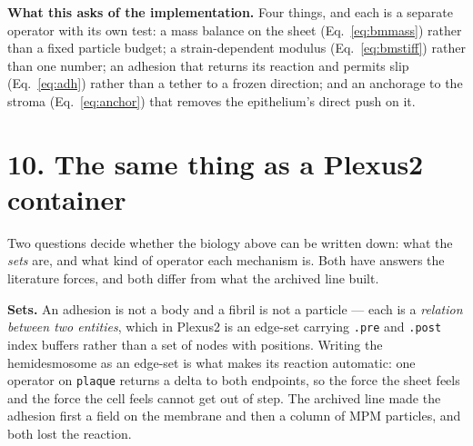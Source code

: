 \documentclass[10pt,a4paper]{article}
\newcommand{\code}[1]{\texttt{#1}}
\begin{document}
\textbf{What this asks of the implementation.} Four things, and each is a separate operator with its
own test: a mass balance on the sheet (Eq.~\ref{eq:bmmass}) rather than a fixed particle budget; a
strain-dependent modulus (Eq.~\ref{eq:bmstiff}) rather than one number; an adhesion that returns its
reaction and permits slip (Eq.~\ref{eq:adh}) rather than a tether to a frozen direction; and an
anchorage to the stroma (Eq.~\ref{eq:anchor}) that removes the epithelium's direct push on it.

\section*{10.\; The same thing as a Plexus2 container}

Two questions decide whether the biology above can be written down: what the \emph{sets} are, and what
kind of operator each mechanism is. Both have answers the literature forces, and both differ from what
the archived line built.

\textbf{Sets.} An adhesion is not a body and a fibril is not a particle --- each is a \emph{relation
between two entities}, which in Plexus2 is an edge-set carrying \code{.pre} and \code{.post} index
buffers rather than a set of nodes with positions. Writing the hemidesmosome as an edge-set is what
makes its reaction automatic: one operator on \code{plaque} returns a delta to both endpoints, so the
force the sheet feels and the force the cell feels cannot get out of step. The archived line made the
adhesion first a field on the membrane and then a column of MPM particles, and both lost the reaction.
\end{document}
